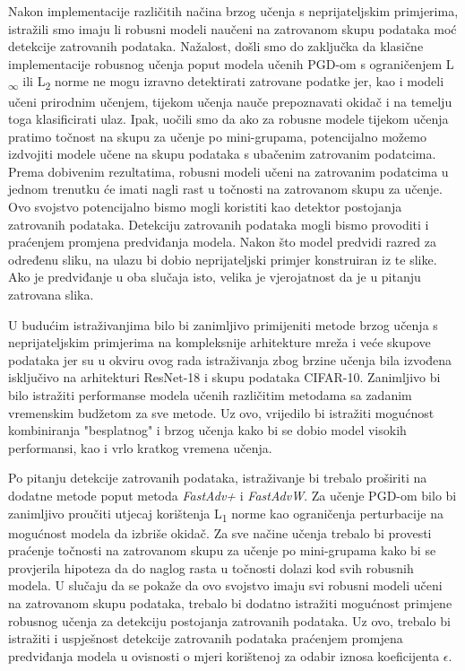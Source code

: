 \documentclass[times, utf8, zavrsni, numeric]{fer}
\begin{document}
Nakon implementacije različitih načina brzog učenja s neprijateljskim primjerima, istražili smo imaju li robusni modeli naučeni na zatrovanom skupu podataka moć detekcije zatrovanih podataka.
Nažalost, došli smo do zaključka da klasične implementacije robusnog učenja poput modela učenih PGD-om s ograničenjem L\textsubscript{$\infty$} ili L\textsubscript{2} norme ne mogu izravno detektirati zatrovane podatke jer, kao i modeli učeni prirodnim učenjem, 
tijekom učenja nauče prepoznavati okidač i na temelju toga klasificirati ulaz. 
Ipak, uočili smo da ako za robusne modele tijekom učenja pratimo točnost na skupu za učenje po mini-grupama, potencijalno možemo izdvojiti modele učene na skupu podataka s ubačenim zatrovanim podatcima.
Prema dobivenim rezultatima, robusni modeli učeni na zatrovanim podatcima u jednom trenutku će imati nagli rast u točnosti na zatrovanom skupu za učenje. Ovo svojstvo potencijalno bismo mogli koristiti kao detektor postojanja zatrovanih podataka.
Detekciju zatrovanih podataka mogli bismo provoditi i praćenjem promjena predviđanja modela. Nakon što model predvidi razred za određenu sliku, na ulazu bi dobio neprijateljski primjer konstruiran iz te slike.
Ako je predviđanje u oba slučaja isto, velika je vjerojatnost da je u pitanju zatrovana slika.

\pagebreak

U budućim istraživanjima bilo bi zanimljivo primijeniti metode brzog učenja s neprijateljskim primjerima na kompleksnije arhitekture mreža i veće skupove podataka 
jer su u okviru ovog rada istraživanja zbog brzine učenja bila izvođena isključivo na arhitekturi ResNet-18 i skupu podataka CIFAR-10. 
Zanimljivo bi bilo istražiti performanse modela učenih različitim metodama sa zadanim vremenskim budžetom za sve metode.
Uz ovo, vrijedilo bi istražiti mogućnost kombiniranja "besplatnog" i brzog učenja kako bi se dobio model visokih performansi, kao i vrlo kratkog vremena učenja. 

Po pitanju detekcije zatrovanih podataka, istraživanje bi trebalo proširiti na dodatne metode poput metoda \textit{FastAdv+} i \textit{FastAdvW}.
Za učenje PGD-om bilo bi zanimljivo proučiti utjecaj korištenja L\textsubscript{1} norme kao ograničenja perturbacije na mogućnost modela da izbriše okidač.
Za sve načine učenja trebalo bi provesti praćenje točnosti na zatrovanom skupu za učenje po mini-grupama kako bi se provjerila hipoteza da do naglog rasta u točnosti dolazi kod svih robusnih modela.
U slučaju da se pokaže da ovo svojstvo imaju svi robusni modeli učeni na zatrovanom skupu podataka, trebalo bi dodatno istražiti mogućnost primjene robusnog učenja za detekciju postojanja zatrovanih podataka.
Uz ovo, trebalo bi istražiti i uspješnost detekcije zatrovanih podataka praćenjem promjena predviđanja modela u ovisnosti o mjeri korištenoj za odabir iznosa koeficijenta $\epsilon$.
\end{document}
